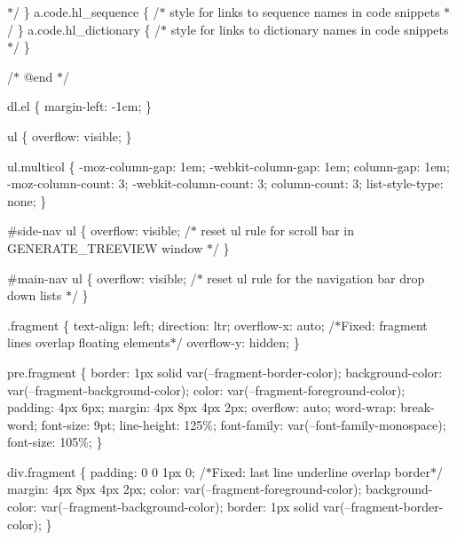 \texorpdfstring{$\ast$}{*}/ \} a.\+code.\+hl\+\_\+sequence \{ /\texorpdfstring{$\ast$}{*} style for links to sequence names in code snippets \texorpdfstring{$\ast$}{*}/ \} a.\+code.\+hl\+\_\+dictionary \{ /\texorpdfstring{$\ast$}{*} style for links to dictionary names in code snippets \texorpdfstring{$\ast$}{*}/ \}

/\texorpdfstring{$\ast$}{*} @end \texorpdfstring{$\ast$}{*}/

dl.\+el \{ margin-\/left\+: -\/1cm; \}

ul \{ overflow\+: visible; \}

ul.\+multicol \{ -\/moz-\/column-\/gap\+: 1em; -\/webkit-\/column-\/gap\+: 1em; column-\/gap\+: 1em; -\/moz-\/column-\/count\+: 3; -\/webkit-\/column-\/count\+: 3; column-\/count\+: 3; list-\/style-\/type\+: none; \}

\#side-\/nav ul \{ overflow\+: visible; /\texorpdfstring{$\ast$}{*} reset ul rule for scroll bar in GENERATE\+\_\+\+TREEVIEW window \texorpdfstring{$\ast$}{*}/ \}

\#main-\/nav ul \{ overflow\+: visible; /\texorpdfstring{$\ast$}{*} reset ul rule for the navigation bar drop down lists \texorpdfstring{$\ast$}{*}/ \}

.fragment \{ text-\/align\+: left; direction\+: ltr; overflow-\/x\+: auto; /\texorpdfstring{$\ast$}{*}\+Fixed\+: fragment lines overlap floating elements\texorpdfstring{$\ast$}{*}/ overflow-\/y\+: hidden; \}

pre.\+fragment \{ border\+: 1px solid var(--fragment-\/border-\/color); background-\/color\+: var(--fragment-\/background-\/color); color\+: var(--fragment-\/foreground-\/color); padding\+: 4px 6px; margin\+: 4px 8px 4px 2px; overflow\+: auto; word-\/wrap\+: break-\/word; font-\/size\+: 9pt; line-\/height\+: 125\%; font-\/family\+: var(--font-\/family-\/monospace); font-\/size\+: 105\%; \}

div.\+fragment \{ padding\+: 0 0 1px 0; /\texorpdfstring{$\ast$}{*}\+Fixed\+: last line underline overlap border\texorpdfstring{$\ast$}{*}/ margin\+: 4px 8px 4px 2px; color\+: var(--fragment-\/foreground-\/color); background-\/color\+: var(--fragment-\/background-\/color); border\+: 1px solid var(--fragment-\/border-\/color); \}

